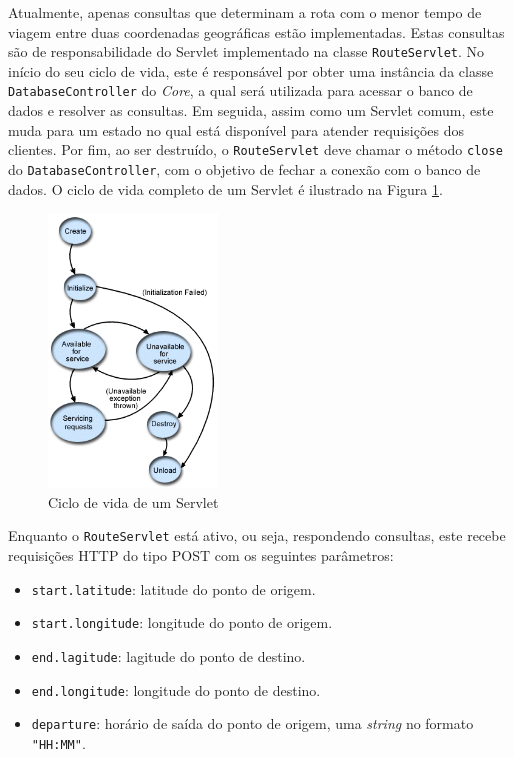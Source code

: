 Atualmente, apenas consultas que determinam a rota com o menor tempo de viagem entre duas coordenadas geográficas estão implementadas.
Estas consultas são de responsabilidade do Servlet implementado na classe \texttt{RouteServlet}.
No início do seu ciclo de vida, este é responsável por obter uma instância da classe \texttt{DatabaseController} do \emph{Core}, a qual será utilizada para acessar o banco de dados e resolver as consultas.
Em seguida, assim como um Servlet comum, este muda para um estado no qual está disponível para atender requisições dos clientes.
Por fim, ao ser destruído, o \texttt{RouteServlet} deve chamar o método \texttt{close} do \texttt{DatabaseController}, com o objetivo de fechar a conexão com o banco de dados.
O ciclo de vida completo de um Servlet é ilustrado na Figura \ref{fig:servletciclo}.

\begin{figure}[!htb]
	\centering
	\includegraphics[width=0.4\textwidth]{./imgs/servletciclo.png}
	\caption[Ciclo de vida de um Servlet]{Ciclo de vida de um Servlet}
	\label{fig:servletciclo}
\end{figure}

Enquanto o \texttt{RouteServlet} está ativo, ou seja, respondendo consultas, este recebe requisições HTTP do tipo POST com os seguintes parâmetros:
\begin{itemize}
	\item \texttt{start.latitude}: latitude do ponto de origem.
	\item \texttt{start.longitude}: longitude do ponto de origem.
	\item \texttt{end.lagitude}: lagitude do ponto de destino.
	\item \texttt{end.longitude}: longitude do ponto de destino.
	\item \texttt{departure}: horário de saída do ponto de origem, uma \emph{string} no formato \texttt{"HH:MM"}.
\end{itemize}

